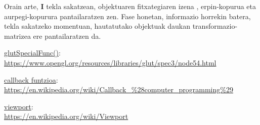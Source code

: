 \documentclass[12pt]{article}
\newcommand{\tekla}[1] {\textbf{#1}}
\begin{document}
Orain arte, \tekla{I} tekla sakatzean, objektuaren fitxategiaren izena , erpin-kopurua eta aurpegi-kopurura pantailaratzen zen. Fase honetan, informazio horrekin batera, tekla sakatzeko momentuan, hautatutako objektuak daukan transformazio-matrizea ere pantailaratzen da.\\





\begin{thebibliography}{9}

\underline{glutSpecialFunc()}:\\
\url{https://www.opengl.org/resources/libraries/glut/spec3/node54.html}

\underline{callback funtzioa}:\\
\url{https://en.wikipedia.org/wiki/Callback_%28computer_programming%29}

\underline{viewport}:\\
\url{https://en.wikipedia.org/wiki/Viewport}

\end{thebibliography}
\end{document}
